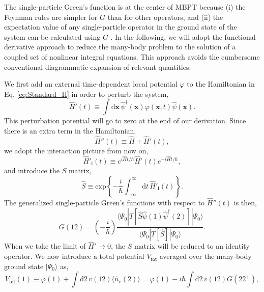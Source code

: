 \documentclass[11pt, oneside]{article}          %
\begin{document}
The single-particle Green's function is at the center of MBPT because (i) the Feynman rules are simpler for $G$ than for other operators, and (ii) the expectation value of any single-particle operator in the ground state of the system can be calculated using $G$ \cite{fetter2012quantum}. In the following, we will adopt the functional derivative approach \cite{baym1961field, hedin1970effects, strinati1988application} to reduce the many-body problem to the solution of a coupled set of nonlinear integral equations. This approach avoids the cumbersome conventional diagrammatic expansion of relevant quantities.

We first add an external time-dependent local potential $\varphi$ to the Hamiltonian in Eq. \eqref{eq:Standard_H} in order to perturb the system,
\begin{equation}
  \label{eq:Hp_perturb}
  \hat{H}' (t) \equiv \int \mathrm{d}{\bm x} \, \hat{\psi}^{\dagger}({\bm x}) \varphi({\bm x}, t) \hat{\psi}({\bm x}).
\end{equation}
This perturbation potential will go to zero at the end of our derivation. Since there is an extra term in the Hamiltonian,
\begin{equation}
  \label{eq:Hamiltonian_more}
  \hat{H}''(t) \equiv \hat{H} + \hat{H}'(t),
\end{equation}
we adopt the interaction picture from now on,
\begin{equation}
  \label{eq:H_interaction}
  \hat{H}'_{\mathsf{I}}(t) \equiv e^{i \hat{H}t /\hbar} \hat{H}'(t) e^{-i \hat{H} t /\hbar},
\end{equation}
and introduce the $S$ matrix,
\begin{equation}
  \hat{S} \equiv \text{exp} \left \{ -\frac{i}{\hbar} \int^{\infty}_{-\infty} \mathrm{d} t \, \hat{H}'_{\mathsf{I}} (t) \right \}.
\end{equation}
The generalized single-particle Green's functions with respect to $\hat{H}''(t)$ is then,
\begin{equation}
  G(12) = \left ( - \frac{i}{\hbar} \right ) \frac{\langle \Psi_0 | T[\hat{S} \hat{\psi}(1) \hat{\psi}^{\dagger}(2)] | \Psi_0 \rangle}{\langle \Psi_0 | T[\hat{S}] | \Psi_0 \rangle}.
\end{equation}
When we take the limit of $\hat{H}' \rightarrow 0$, the $S$ matrix will be reduced to an identity operator. We now introduce a total potential $V_{\mathsf{tot}}$ averaged over the many-body ground state $| \Psi_0 \rangle$ as,
\begin{equation}
  \label{eq:V_tot_b}
  V_{\mathsf{tot}}(1) \equiv \varphi(1) + \int \mathrm{d}2 \, v(12) \langle \hat{n}_e(2)\rangle = \varphi(1) - i \hbar \int \mathrm{d}2 \, v(12) G(22^{+}),
\end{equation}
\end{document}
